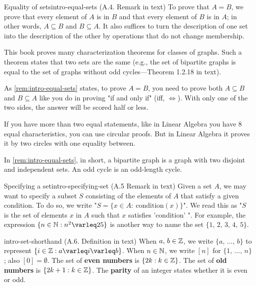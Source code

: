 \documentclass[../src/handouts/main.tex]{subfiles}
\begin{document}

\begin{remark}{Equality of sets}{intro-equal-sets}
  (A.4. Remark in text)
  To prove that $A = B$, we prove that every element of $A$ is in $B$ and that every element of $B$ is in $A$; in other words, $A \subseteq B$ and $B \subseteq A$. It also suffices to turn the description of one set into the description of the other by operations that do not change membership.

  This book proves many characterization theorems for classes of graphs. Such a theorem states that two sets are the same (e.g., the set of bipartite graphs is equal to the set of graphs without odd cycles---Theorem 1.2.18 in text). %
\end{remark}

As \cref{rem:intro-equal-sets} states, to prove $A = B$, you need to prove both $A \subseteq B$ and $B \subseteq A$ like you do in proving "if and only if" (iff, $\iff$). With only one of the two sides, the answer will be scored half or less.

If you have more than two equal statements, like in Linear Algebra you have 8 equal characteristics, you can use circular proofs. But in Linear Algebra it proves it by two circles with one equality between.

In \cref{rem:intro-equal-sets}, in short, a bipartite graph is a graph with two disjoint and independent sets. An odd cycle is an odd-length cycle.

\begin{remark}{Specifying a set}{intro-specifying-set}
  (A.5 Remark in text)
  Given a set $A$, we may want to specify a subset $S$ consisting of the elements of $A$ that satisfy a given condition. To do so, we write "$S = \{ x \in A:\ \text{condition}(x)\}$". We read this as "$S$ is the set of elements $x$ in $A$ such that $x$ satisfies 'condition' ". For example, the expression $\{ n \in \N : n^2 \leq 25 \}$ is another way to name the set $\{ 1,\, 2,\, 3,\, 4,\, 5 \}$.
\end{remark}

\begin{definition}{}{intro-set-shorthand}
  (A.6. Definition in text)
  When $a,\, b \in \mathbb{Z}$, we write $\{a,\, \ldots,\, b\}$ to represent $\{ i \in \Z: a \leq i \leq b \}$.
  When $n \in \mathbb{N}$, we write $[n]$ for $\{1,\, \ldots,\, n\}$; also $[0] = \emptyset$.
  The set of \textbf{even numbers} is $\{ 2 k : k \in \mathbb{Z} \}$.
  The set of \textbf{old numbers} is $\{ 2 k + 1 : k \in \mathbb{Z} \}$.
  The \textbf{parity} of an integer states whether it is even or odd.
\end{definition}
\end{document}
